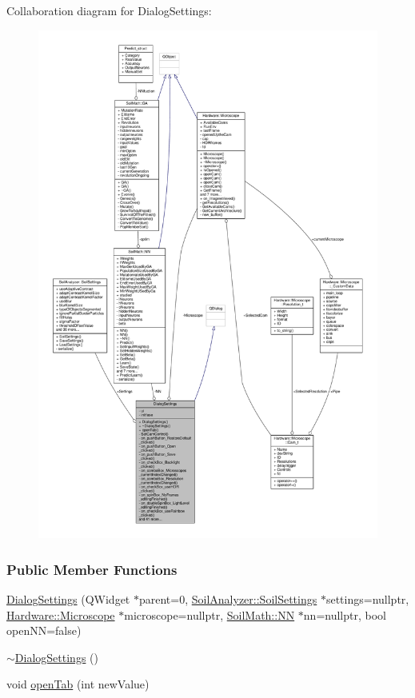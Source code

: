 Collaboration diagram for Dialog\+Settings\+:
\nopagebreak
\begin{figure}[H]
\begin{center}
\leavevmode
\includegraphics[width=350pt]{class_dialog_settings__coll__graph}
\end{center}
\end{figure}
\subsubsection*{Public Member Functions}
\begin{DoxyCompactItemize}
\item 
\hyperlink{class_dialog_settings_a891cd177b754ee9249567759998ff47a}{Dialog\+Settings} (Q\+Widget $\ast$parent=0, \hyperlink{class_soil_analyzer_1_1_soil_settings}{Soil\+Analyzer\+::\+Soil\+Settings} $\ast$settings=nullptr, \hyperlink{class_hardware_1_1_microscope}{Hardware\+::\+Microscope} $\ast$microscope=nullptr, \hyperlink{class_soil_math_1_1_n_n}{Soil\+Math\+::\+N\+N} $\ast$nn=nullptr, bool open\+N\+N=false)
\item 
\hyperlink{class_dialog_settings_a10e028cc22f2ab2367f582242fd8115e}{$\sim$\+Dialog\+Settings} ()
\item 
void \hyperlink{class_dialog_settings_ac22fca3a8ea77953fb667c0118860221}{open\+Tab} (int new\+Value)
\end{DoxyCompactItemize}
